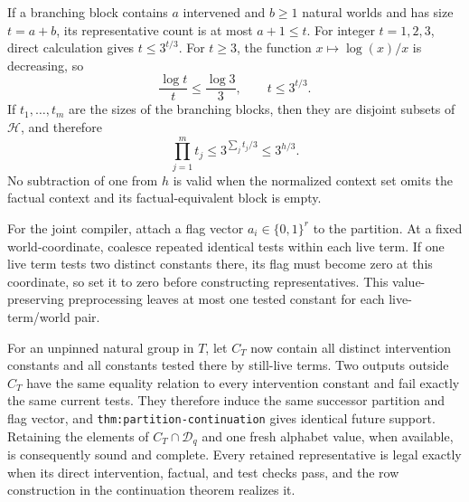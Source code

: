 If a branching block contains \(a\) intervened and \(b\geq1\) natural worlds and has size \(t=a+b\), its representative count is at most \(a+1\leq t\). For integer \(t=1,2,3\), direct calculation gives \(t\leq3^{t/3}\). For \(t\geq3\), the function \(x\mapsto\log(x)/x\) is decreasing, so
\[
 \frac{\log t}{t}\leq\frac{\log3}{3},
 \qquad
 t\leq3^{t/3}.
\]
If \(t_1,\ldots,t_m\) are the sizes of the branching blocks, then they are disjoint subsets of \(\mathcal H\), and therefore
\[
 \prod_{j=1}^m t_j
 \leq3^{\sum_jt_j/3}
 \leq3^{h/3}.
 \tag{3}
\]
No subtraction of one from \(h\) is valid when the normalized context set omits the factual context and its factual-equivalent block is empty.

For the joint compiler, attach a flag vector \(a_i\in\{0,1\}^r\) to the partition. At a fixed world-coordinate, coalesce repeated identical tests within each live term. If one live term tests two distinct constants there, its flag must become zero at this coordinate, so set it to zero before constructing representatives. This value-preserving preprocessing leaves at most one tested constant for each live-term/world pair.

For an unpinned natural group in \(T\), let \(C_T\) now contain all distinct intervention constants and all constants tested there by still-live terms. Two outputs outside \(C_T\) have the same equality relation to every intervention constant and fail exactly the same current tests. They therefore induce the same successor partition and flag vector, and \texttt{thm:partition-continuation} gives identical future support. Retaining the elements of \(C_T\cap\mathcal D_q\) and one fresh alphabet value, when available, is consequently sound and complete. Every retained representative is legal exactly when its direct intervention, factual, and test checks pass, and the row construction in the continuation theorem realizes it.

